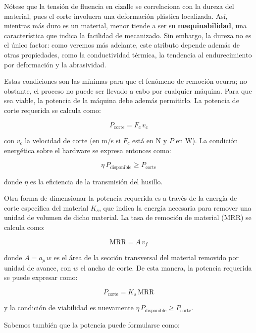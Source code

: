 Nótese que la tensión de fluencia en cizalle se correlaciona con la dureza del material, pues el corte involucra una deformación plástica localizada. Así, mientras más duro es un material, menor tiende a ser su \textbf{maquinabilidad}, una característica que indica la facilidad de mecanizado. Sin embargo, la dureza no es el único factor: como veremos más adelante, este atributo depende además de otras propiedades, como la conductividad térmica, la tendencia al endurecimiento por deformación y la abrasividad.

Estas condiciones son las mínimas para que el fenómeno de remoción ocurra; no obstante, el proceso no puede ser llevado a cabo por cualquier máquina. Para que sea viable, la potencia de la máquina debe además permitirlo. La potencia de corte requerida se calcula como:

\begin{equation}
	P_{\text{corte}} = F_c \, v_c
\end{equation}

con $v_c$ la velocidad de corte (en m/s si $F_c$ está en N y $P$ en W). La condición energética sobre el hardware se expresa entonces como:

\begin{equation}
	\eta \, P_{\text{disponible}} \geq P_{\text{corte}}
\end{equation}

donde $\eta$ es la eficiencia de la transmisión del husillo.

Otra forma de dimensionar la potencia requerida es a través de la energía de corte específica del material $K_s$, que indica la energía necesaria para remover una unidad de volumen de dicho material. La tasa de remoción de material (MRR) se calcula como:

\begin{equation}
	\text{MRR} = A \, v_f
\end{equation}

donde $A = a_p \, w$ es el área de la sección transversal del material removido por unidad de avance, con $w$ el ancho de corte. De esta manera, la potencia requerida se puede expresar como:

\begin{equation}
	P_{\text{corte}} = K_s \, \text{MRR}
\end{equation}

y la condición de viabilidad es nuevamente $\eta\,P_{\text{disponible}} \geq P_{\text{corte}}$.

Sabemos también que la potencia puede formularse como:

